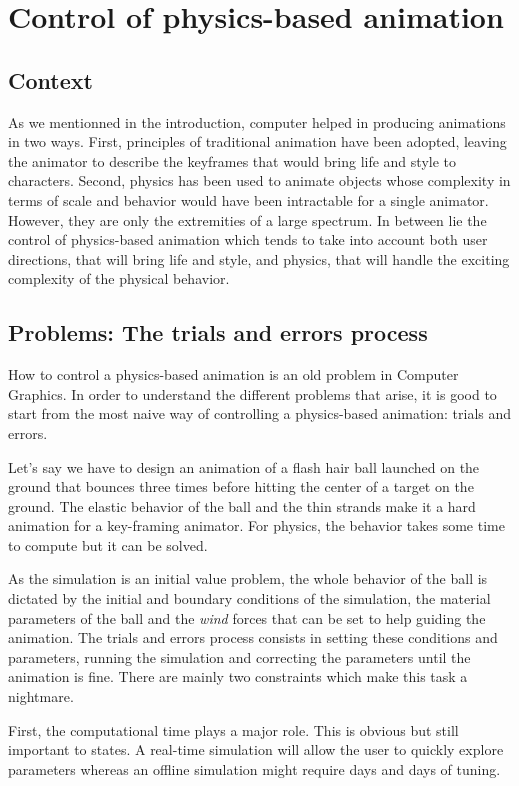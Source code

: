 \section{Control of physics-based animation}

\subsection{Context}
As we mentionned in the introduction, computer helped in producing animations in two ways. First, principles of traditional animation have been adopted, leaving the animator to describe the keyframes that would bring life and style to characters. Second, physics has been used to animate objects whose complexity in terms of scale and behavior would have been intractable for a single animator. However, they are only the extremities of a large spectrum. In between lie the control of physics-based animation which tends to take into account both user directions, that will bring life and style, and physics, that will handle the exciting complexity of the physical behavior.

\subsection{Problems: The trials and errors process}
How to control a physics-based animation is an old problem in Computer Graphics. In order to understand the different problems that arise, it is good to start from the most naive way of controlling a physics-based animation: trials and errors. 

Let's say we have to design an animation of a flash hair ball launched on the ground that bounces three times before hitting the center of a target on the ground. The elastic behavior of the ball and the thin strands make it a hard animation for a key-framing animator. For physics, the behavior takes some time to compute but it can be solved.

As the simulation is an initial value problem, the whole behavior of the ball is dictated by the initial and boundary conditions of the simulation, the material parameters of the ball and the \emph{wind} forces that can be set to help guiding the animation. The trials and errors process consists in setting these conditions and parameters, running the simulation and correcting the parameters until the animation is fine. There are mainly two constraints which make this task a nightmare.

First, the computational time plays a major role. This is obvious but still important to states. A real-time simulation will allow the user to quickly explore parameters whereas an offline simulation might require days and days of tuning.


